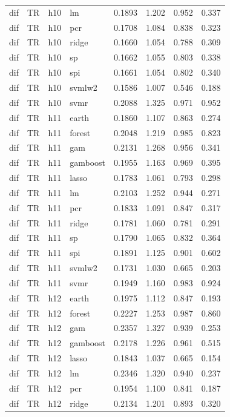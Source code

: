 \begin{ThreePartTable}
\begin{longtable}[t]{llclcccc}
dif & TR & h10 & lm & 0.1893 & 1.202 & 0.952 & 0.337\\
dif & TR & h10 & pcr & 0.1708 & 1.084 & 0.838 & 0.323\\
dif & TR & h10 & ridge & 0.1660 & 1.054 & 0.788 & 0.309\\
dif & TR & h10 & sp & 0.1662 & 1.055 & 0.803 & 0.338\\
dif & TR & h10 & spi & 0.1661 & 1.054 & 0.802 & 0.340\\
dif & TR & h10 & svmlw2 & 0.1586 & 1.007 & 0.546 & 0.188\\
dif & TR & h10 & svmr & 0.2088 & 1.325 & 0.971 & 0.952\\
\addlinespace
dif & TR & h11 & earth & 0.1860 & 1.107 & 0.863 & 0.274\\
dif & TR & h11 & forest & 0.2048 & 1.219 & 0.985 & 0.823\\
dif & TR & h11 & gam & 0.2131 & 1.268 & 0.956 & 0.341\\
dif & TR & h11 & gamboost & 0.1955 & 1.163 & 0.969 & 0.395\\
dif & TR & h11 & lasso & 0.1783 & 1.061 & 0.793 & 0.298\\
dif & TR & h11 & lm & 0.2103 & 1.252 & 0.944 & 0.271\\
dif & TR & h11 & pcr & 0.1833 & 1.091 & 0.847 & 0.317\\
dif & TR & h11 & ridge & 0.1781 & 1.060 & 0.781 & 0.291\\
dif & TR & h11 & sp & 0.1790 & 1.065 & 0.832 & 0.364\\
dif & TR & h11 & spi & 0.1891 & 1.125 & 0.901 & 0.602\\
dif & TR & h11 & svmlw2 & 0.1731 & 1.030 & 0.665 & 0.203\\
dif & TR & h11 & svmr & 0.1949 & 1.160 & 0.983 & 0.924\\
\addlinespace
dif & TR & h12 & earth & 0.1975 & 1.112 & 0.847 & 0.193\\
dif & TR & h12 & forest & 0.2227 & 1.253 & 0.987 & 0.860\\
dif & TR & h12 & gam & 0.2357 & 1.327 & 0.939 & 0.253\\
dif & TR & h12 & gamboost & 0.2178 & 1.226 & 0.961 & 0.515\\
dif & TR & h12 & lasso & 0.1843 & 1.037 & 0.665 & 0.154\\
dif & TR & h12 & lm & 0.2346 & 1.320 & 0.940 & 0.237\\
dif & TR & h12 & pcr & 0.1954 & 1.100 & 0.841 & 0.187\\
dif & TR & h12 & ridge & 0.2134 & 1.201 & 0.893 & 0.320\\

\end{longtable}
\end{ThreePartTable}
